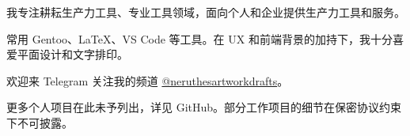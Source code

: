     \begin{minipage}[t]{50mm}
        \RaggedRight

        我专注耕耘生产力工具、专业工具领域，面向个人和企业提供生产力工具和服务。
    \end{minipage}
    \hfill
    \begin{minipage}[t]{50mm}
        \RaggedRight

        常用 Gentoo、\LaTeX、VS Code 等工具。在 UX 和前端背景的加持下，我十分喜爱平面设计和文字排印。
    \end{minipage}
    \hfill
    \begin{minipage}[t]{50mm}
        \RaggedRight

        欢迎来 Telegram 关注我的频道 \underline{@neruthesartworkdrafts}。
    \end{minipage}



    \vfill

    \begin{minipage}[t]{\textwidth}
        \footnotesize

        更多个人项目在此未予列出，详见 GitHub。部分工作项目的细节在保密协议约束下不可披露。
    \end{minipage}








